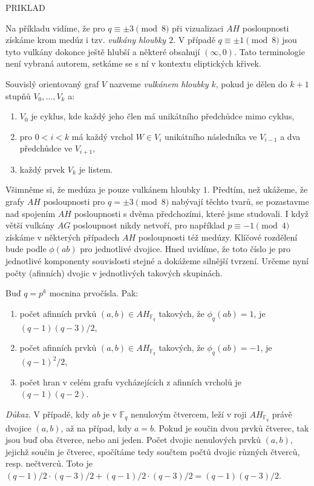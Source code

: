 \documentclass[12pt]{report}
\begin{document}
PRIKLAD

Na příkladu vidíme, že pro $q \equiv \pm 3 \pmod{8}$ při vizualizaci $AH$ posloupnosti získáme krom medúz i tzv. \textit{vulkány hloubky $2$}. V případě $q \equiv \pm 1 \pmod{8}$ jsou tyto vulkány dokonce ještě hlubší a některé obsahují $(\infty,0)$. Tato terminologie není vybraná autorem, setkáme se s ní v kontextu eliptických křivek. 
\begin{definice}
Souvislý orientovaný graf $V$ nazveme \textit{vulkánem hloubky $k$}, pokud je dělen do $k+1$ stupňů $V_0,\dots,V_k$ a:
\begin{enumerate}
\item $V_0$ je cyklus, kde každý jeho člen má unikátního předchůdce mimo cyklus,
\item pro $0 <i < k$ má každý vrchol $W \in V_i$ unikátního následníka ve $V_{i-1}$ a dva předchůdce ve $V_{i+1}$,
\item každý prvek $V_k$ je listem.
\end{enumerate}
\end{definice}
Všimněme si, že medúza je pouze vulkánem hloubky $1$. Předtím, než ukážeme, že grafy $AH$ posloupnosti pro $q = \pm 3 \pmod{8}$ nabývají těchto tvarů, se pozastavme nad spojením $AH$ posloupnosti s dvěma předchozími, které jsme studovali. I když větší vulkány $AG$ posloupnost nikdy netvoří, pro například $p \equiv -1 \pmod{4}$ získáme v některých případech $AH$ posloupnosti též medúzy. Klíčové rozdělení bude podle $\phi(ab)$ pro jednotlivé dvojice. Hned uvidíme, že toto číslo je pro jednotlivé komponenty souvislosti stejné a dokážeme silnější tvrzení. Určeme nyní počty (afinních) dvojic v jednotlivých takových skupinách.

\begin{veta}\label{pocetv}
Buď $q = p^k$ mocnina prvočísla. Pak:
\begin{enumerate}
\item počet afinních prvků $(a,b) \in AH_{\mathbb{F}_q}$ takových, že $\phi_q(ab) = 1$, je $(q-1)(q-3)/2$, 
\item počet afinních prvků $(a,b) \in AH_{\mathbb{F}_q}$ takových, že $\phi_q(ab) = -1$, je $(q-1)^2/2$,
\item počet hran v celém grafu vycházejících z afinních vrcholů je $(q-1)(q-2)$.
\end{enumerate}

\end{veta}  
\noindent \textit{Důkaz.} V případě, kdy $ab$ je v $\mathbb{F}_q$ nenulovým čtvercem, leží v roji $AH_{\mathbb{F}_q}$ právě dvojice $(a,b)$, až na případ, kdy $a=b$. Pokud je součin dvou prvků čtverec, tak jsou buď oba čtverce, nebo ani jeden. Počet dvojic nenulových prvků $(a,b)$, jejichž součin je čtverec, spočítáme tedy součtem počtů dvojic různých čtverců, resp. nečtverců. Toto je $(q-1)/2 \cdot (q-3)/2 + (q-1)/2 \cdot (q-3)/2 =  (q-1)(q-3)/2$.
\end{document}
